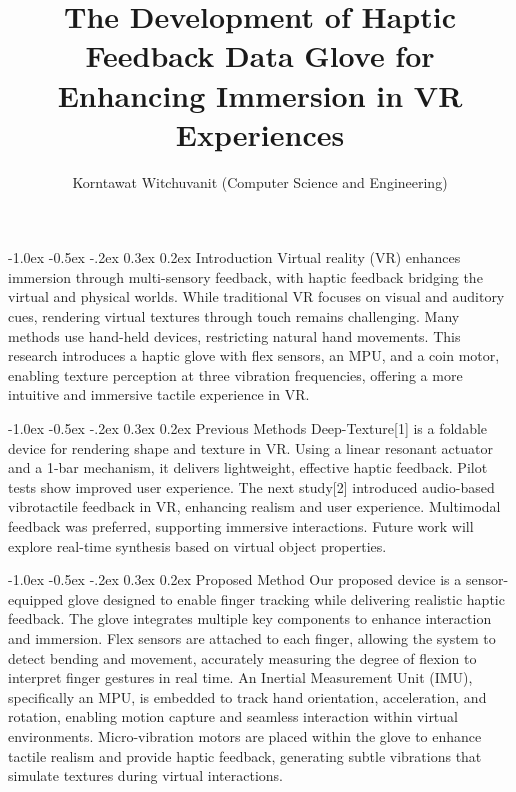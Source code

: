 \documentclass[a4paper,twocolumn]{article}
\title{\textbf{The Development of Haptic Feedback Data Glove for Enhancing Immersion in VR Experiences}}
\author{\small{Korntawat Witchuvanit (Computer Science and Engineering)}}
\date{\vspace{-3em}}
\begin{document}
\small
\maketitle

\makeatletter
\renewcommand\section{\@startsection{section}{1}{\z@}%
  {-1.0ex \@plus -0.5ex \@minus -.2ex}%
  {0.3ex \@plus 0.2ex}%
  {\normalfont\small\bfseries}}
\makeatother



\section{Introduction}
Virtual reality (VR) enhances immersion through multi-sensory feedback, with haptic feedback bridging the virtual and physical worlds. While traditional VR focuses on visual and auditory cues, rendering virtual textures through touch remains challenging. Many methods use hand-held devices, restricting natural hand movements. This research introduces a haptic glove with flex sensors, an MPU, and a coin motor, enabling texture perception at three vibration frequencies, offering a more intuitive and immersive tactile experience in VR.

\section{Previous Methods}
Deep-Texture[1] is a foldable device for rendering shape and texture in VR. Using a linear resonant actuator and a 1-bar mechanism, it delivers lightweight, effective haptic feedback. Pilot tests show improved user experience. The next study[2] introduced audio-based vibrotactile feedback in VR, enhancing realism and user experience. Multimodal feedback was preferred, supporting immersive interactions. Future work will explore real-time synthesis based on virtual object properties.

\section{Proposed Method}
Our proposed device is a sensor-equipped glove designed to enable finger tracking while delivering realistic haptic feedback. The glove integrates multiple key components to enhance interaction and immersion. Flex sensors are attached to each finger, allowing the system to detect bending and movement, accurately measuring the degree of flexion to interpret finger gestures in real time. An Inertial Measurement Unit (IMU), specifically an MPU, is embedded to track hand orientation, acceleration, and rotation, enabling motion capture and seamless interaction within virtual environments. Micro-vibration motors are placed within the glove to enhance tactile realism and provide haptic feedback, generating subtle vibrations that simulate textures during virtual interactions.
\end{document}
